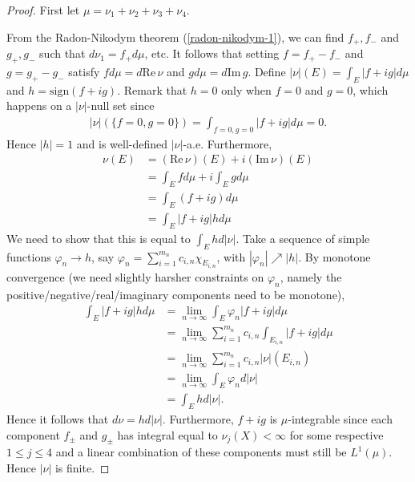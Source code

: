 \documentclass[11pt]{amsart}
\theoremstyle{definition}
\numberwithin{equation}{section}
\begin{document}
\begin{proof}
    First let $\mu=\nu_1+\nu_2+\nu_3+\nu_4$.

    From the Radon-Nikodym theorem (\ref{radon-nikodym-1}), we can find $f_+,f_-$ and $g_+,g_-$ such that $d\nu_1=f_+d\mu$, etc. It follows that setting $f=f_+-f_-$ and $g=g_+-g_-$ satisfy $fd\mu=d\mathrm{Re}\,\nu$ and $gd\mu=d\mathrm{Im}\,g$. Define $|\nu|(E)=\int_E|f+ig|d\mu$ and $h=\mathrm{sign}(f+ig)$. Remark that $h=0$ only when $f=0$ and $g=0$, which happens on a $|\nu|$-null set since 
    \begin{align*}
        |\nu|(\{f=0,g=0\})=\int_{f=0,g=0}|f+ig|d\mu=0.
    \end{align*}
    Hence $|h|=1$ and is well-defined $|\nu|$-a.e. Furthermore, 
    \begin{align*}
        \nu(E)&=(\mathrm{Re}\,\nu)(E)+i(\mathrm{Im}\,\nu)(E)\\
        &=\int_Efd\mu+i\int_{E}gd\mu\\
        &=\int_E(f+ig)d\mu\\
        &=\int_E|f+ig|hd\mu
    \end{align*}
    We need to show that this is equal to $\int_Ehd|\nu|$. Take a sequence of simple functions $\varphi_n\to h$, say $\varphi_n=\sum_{i=1}^{m_n}c_{i,n}\chi_{E_{i,n}}$, with $|\varphi_n|\nearrow |h|$. By monotone convergence (we need slightly harsher constraints on $\varphi_n$, namely the positive/negative/real/imaginary components need to be monotone),
    \begin{align*}
        \int_E|f+ig|hd\mu&=\lim_{n\to\infty}\int_E\varphi_n|f+ig|d\mu\\
        &=\lim_{n\to\infty}\sum_{i=1}^{m_n}c_{i,n}\int_{E_{i,n}}|f+ig|d\mu\\
        &=\lim_{n\to\infty}\sum_{i=1}^{m_n}c_{i,n}|\nu|(E_{i,n})\\
        &=\lim_{n\to\infty}\int_E\varphi_nd|\nu|\\
        &=\int_Ehd|\nu|.
    \end{align*}
    Hence it follows that $d\nu=hd|\nu|$. Furthermore, $f+ig$ is $\mu$-integrable since each component $f_\pm$ and $g_\pm$ has integral equal to $\nu_j(X)<\infty$ for some respective $1\le j\le 4$ and a linear combination of these components must still be $L^1(\mu)$. Hence $|\nu|$ is finite.


\end{proof}
\end{document}
